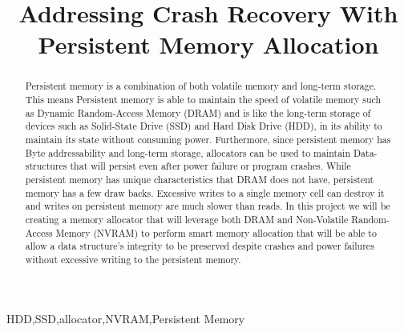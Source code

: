 \documentclass[conference]{IEEEtran}
\begin{document}
\title{Addressing Crash Recovery With Persistent Memory Allocation\\
{\footnotesize \textsuperscript{}}
}

\author{
\and
{}
\and
{}

}
\maketitle

\begin{abstract}
Persistent memory is a combination of both volatile memory and long-term storage.  This means Persistent memory is able to maintain the speed of volatile memory such as Dynamic Random-Access Memory (DRAM) and is like the long-term storage of devices such as Solid-State Drive (SSD) and Hard Disk Drive (HDD), in its ability to maintain its state without consuming power. Furthermore, since persistent memory has Byte addressability and long-term storage, allocators can be used to maintain Data-structures that will persist even after power failure or program crashes. While persistent memory has unique characteristics that DRAM does not have, persistent memory has a few draw backs. Excessive writes to a single memory cell can destroy it and writes on persistent memory are much slower than reads. In this project we will be creating a memory allocator that will leverage both DRAM and Non-Volatile Random-Access Memory (NVRAM) to perform smart memory allocation that will be able to allow a data structure’s integrity to be preserved despite crashes and power failures without excessive writing to the persistent memory.
\end{abstract}

\begin{IEEEkeywords}
HDD,SSD,allocator,NVRAM,Persistent Memory
\end{IEEEkeywords}
\end{document}
